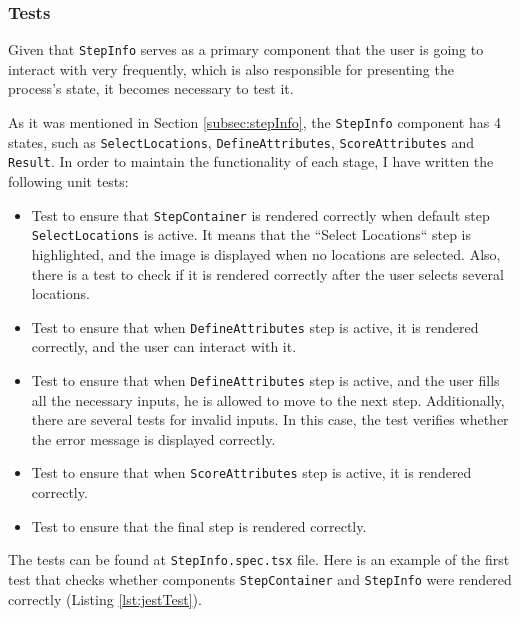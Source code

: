 \subsubsection{Tests}

Given that \texttt{StepInfo} serves as a primary component that the user is going to interact with very frequently, which is also responsible for presenting the process's state, it becomes necessary to test it. 

As it was mentioned in Section \ref{subsec:stepInfo}, the \texttt{StepInfo} component has 4 states, such as \texttt{SelectLocations}, \texttt{DefineAttributes}, \texttt{ScoreAttributes} and \texttt{Result}. In order to maintain the functionality of each stage, I have written the following unit tests:

\begin{itemize}
    \item Test to ensure that \texttt{StepContainer} is rendered correctly when default step\\ \texttt{SelectLocations} is active. It means that the ``Select Locations`` step is highlighted, and the image is displayed when no locations are selected. Also, there is a test to check if it is rendered correctly after the user selects several locations.
    \item Test to ensure that when \texttt{DefineAttributes} step is active, it is rendered correctly, and the user can interact with it.
    \item Test to ensure that when \texttt{DefineAttributes} step is active, and the user fills all the necessary inputs, he is allowed to move to the next step. Additionally, there are several tests for invalid inputs. In this case, the test verifies whether the error message is displayed correctly.
    \item Test to ensure that when \texttt{ScoreAttributes} step is active, it is rendered correctly.
    \item Test to ensure that the final step is rendered correctly.
\end{itemize}

The tests can be found at \texttt{StepInfo.spec.tsx} file. Here is an example of the first test that checks whether components \texttt{StepContainer} and \texttt{StepInfo} were rendered correctly (Listing \ref{lst:jestTest}).

